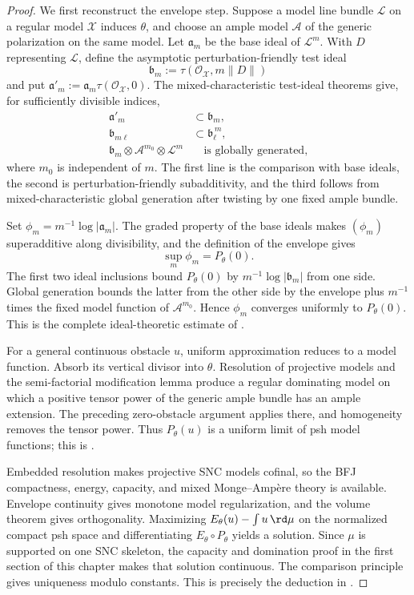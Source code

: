 \begin{proof}
We first reconstruct the envelope step.  Suppose a model line bundle
$\mathcal L$ on a regular model $\mathcal X$ induces $\theta$, and choose
an ample model $\mathcal A$ of the generic polarization on the same model.
Let $\mathfrak a_m$ be the base ideal of $\mathcal L^m$.  With
$D$ representing $\mathcal L$, define the asymptotic perturbation-friendly
test ideal
\[
             \mathfrak b_m:=\tau(\mathcal O_{\mathcal X},m\|D\|)
\]
and put
$\mathfrak a'_m:=\mathfrak a_m\tau(\mathcal O_{\mathcal X},0)$.
The mixed-characteristic test-ideal theorems give, for sufficiently
divisible indices,
\begin{align*}
 \mathfrak a'_m&\subset\mathfrak b_m,\\
 \mathfrak b_{m\ell}&\subset\mathfrak b_\ell^{\,m},\\
 \mathfrak b_m\otimes\mathcal A^{m_0}\otimes\mathcal L^m
      &\quad\text{is globally generated},
\end{align*}
where $m_0$ is independent of $m$.  The first line is the comparison with
base ideals, the second is perturbation-friendly subadditivity, and the
third follows from mixed-characteristic global generation after twisting
by one fixed ample bundle.

Set $\phi_m=m^{-1}\log|\mathfrak a_m|$.  The graded property of the base
ideals makes $(\phi_m)$ superadditive along divisibility, and the definition
of the envelope gives
\[
                   \sup_m\phi_m=P_\theta(0).
\]
The first two ideal inclusions bound $P_\theta(0)$ by
$m^{-1}\log|\mathfrak b_m|$ from one side.  Global generation bounds the
latter from the other side by the envelope plus $m^{-1}$ times the fixed
model function of $\mathcal A^{m_0}$.  Hence $\phi_m$ converges uniformly
to $P_\theta(0)$.  This is the complete ideal-theoretic estimate of
\cite[Theorem~5.1]{FGK25}.

For a general continuous obstacle $u$, uniform approximation reduces to a
model function.  Absorb its vertical divisor into $\theta$.  Resolution of
projective models and the semi-factorial modification lemma produce a
regular dominating model on which a positive tensor power of the generic
ample bundle has an ample extension.  The preceding zero-obstacle argument
applies there, and homogeneity removes the tensor power.  Thus
$P_\theta(u)$ is a uniform limit of psh model functions; this is
\cite[Theorem~7.1]{FGK25}.

Embedded resolution makes projective SNC models cofinal, so the BFJ
compactness, energy, capacity, and mixed Monge--Amp\`ere theory is
available.  Envelope continuity gives monotone model regularization, and
the volume theorem
\cite[Theorems~6.3.2--6.3.3]{BGGJKM20} gives orthogonality.  Maximizing
$E_\theta(u)-\int u\,\rd\mu$ on the normalized compact psh space and
differentiating $E_\theta\circ P_\theta$ yields a solution.  Since $\mu$ is
supported on one SNC skeleton, the capacity and domination proof in the
first section of this chapter makes that solution continuous.  The
comparison principle gives uniqueness modulo constants.  This is precisely
the deduction in \cite[Theorem~8.1]{FGK25}.
\end{proof}


